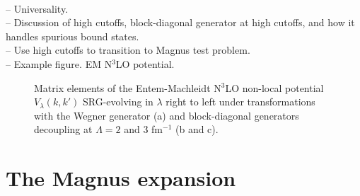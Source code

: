 \documentclass[preprintnumbers,floatfix,aps,prc,preprint,nofootinbib]{revtex4-1}
\begin{document}
\\
-- Universality.
\\
-- Discussion of high cutoffs, block-diagonal generator at high cutoffs, and how it handles spurious bound states.
\\
-- Use high cutoffs to transition to Magnus test problem.
\\
-- Example figure. EM N$^3$LO potential.
%
\begin{figure}[H]
	\centering
	

	\caption{Matrix elements of the Entem-Machleidt N$^3$LO non-local potential $V_{\lambda}(k, k')$ SRG-evolving in $\lambda$ right to left under transformations with the Wegner generator (a) and block-diagonal generators decoupling at $\Lambda=2$ and $3$ fm$^{-1}$ (b and c).}
	\label{potential_contours_kvnn10_3S1}
\end{figure}


\section{The Magnus expansion}
\label{sec:magnus_expansion}
\end{document}
